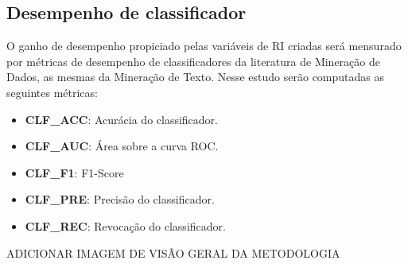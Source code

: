     \subsection{Desempenho de classificador}  \label{subsec:Desempenho-de-classificador}
    O ganho de desempenho propiciado pelas variáveis de RI criadas será mensurado por métricas de desempenho de classificadores da literatura de Mineração de Dados, as mesmas da Mineração de Texto.
    Nesse estudo serão computadas as seguintes métricas:
    \begin{itemize}
        \item \textbf{CLF\_ACC}: Acurácia do classificador.
        \item \textbf{CLF\_AUC}: Área sobre a curva ROC.
        \item \textbf{CLF\_F1}: F1-Score
        \item \textbf{CLF\_PRE}: Precisão do classificador.
        \item \textbf{CLF\_REC}: Revocação do classificador.
    \end{itemize}


ADICIONAR IMAGEM DE VISÃO GERAL DA METODOLOGIA








% 
